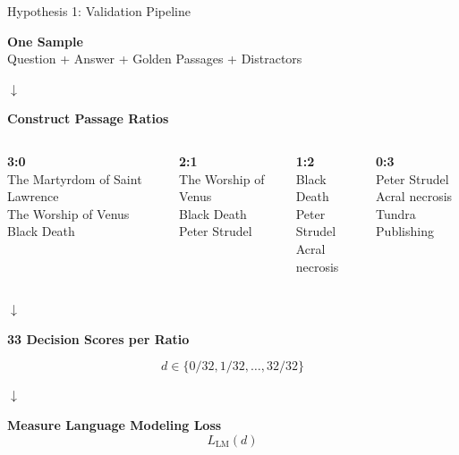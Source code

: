 \begin{frame}{Hypothesis 1: Validation Pipeline}

\centering

\textbf{One Sample}\\
\small Question + Answer + Golden Passages + Distractors

\vspace{0.2cm}
$\downarrow$

\textbf{Construct Passage Ratios}

\vspace{0.2cm}

\begin{columns}[T,onlytextwidth]
    \centering
    \textbf{3:0}\\
    \scriptsize
    The Martyrdom of Saint Lawrence\\
    The Worship of Venus\\
    Black Death

    \centering
    \textbf{2:1}\\
    \scriptsize
    The Worship of Venus\\
    Black Death\\
    Peter Strudel

    \centering
    \textbf{1:2}\\
    \scriptsize
    Black Death\\
    Peter Strudel\\
    Acral necrosis

    \centering
    \textbf{0:3}\\
    \scriptsize
    Peter Strudel\\
    Acral necrosis\\
    Tundra Publishing
\end{columns}

\vspace{0.1cm}
$\downarrow$

\textbf{33 Decision Scores per Ratio}

\[
d \in \{0/32, 1/32, \ldots, 32/32\}
\]

\vspace{0.1cm}
$\downarrow$

\textbf{Measure Language Modeling Loss}
\[
L_{\mathrm{LM}}(d)
\]

\end{frame}

